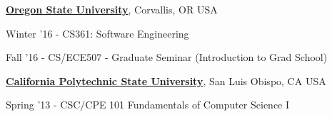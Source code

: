 \documentclass[10pt]{article}
\begin{document}
\begin{outerlist}
\item[]\href{http://www.oregonstate.edu/}{\textbf{Oregon State University}},
Corvallis, OR USA
             \begin{innerlist}
             \item Winter '16 - CS361: Software Engineering
             \item Fall '16 - CS/ECE507 - Graduate Seminar (Introduction to Grad School)
\end{innerlist}

\item[] \href{http://www.calpoly.edu/}{\textbf{California Polytechnic State University}},
San Luis Obispo, CA USA
             \begin{innerlist}
             \item Spring '13 - CSC/CPE 101 Fundamentals of Computer Science I  
\end{innerlist}
\end{outerlist}
\end{document}
